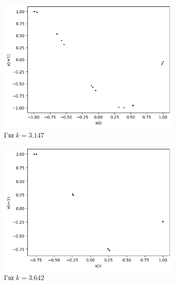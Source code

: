 \begin{figure}[ht]
\begin{subfigure}[b]{0.4\textwidth}
		\includegraphics[width=\textwidth]{LateX images/cheb q=0.8/g8}
		\caption{Για $k=3.147$}
		\label{f:k135}
	\end{subfigure}
	\hfill
\begin{subfigure}[b]{0.4\textwidth}
	\centering
	\includegraphics[width=\textwidth]{LateX images/cheb q=0.8/g10}
	\caption{Για $k=3.642$}
	\label{f:k137}
\end{subfigure}
\hfill	
	\begin{subfigure}[b]{0.4\textwidth}
		\centering

\end{subfigure}
\end{figure}
